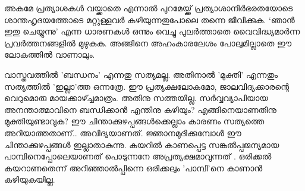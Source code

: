 അകമേ പ്രത്യാശകൾ വയ്ക്കാതെ എന്നാൽ പുറമേയ്ക്ക് പ്രത്യാശാനിര്‍ഭരതയോടെ ശാന്തഹൃദയത്തോടെ മറ്റുള്ളവർ കഴിയുന്നതുപോലെ തന്നെ ജീവിക്കുക. ‘ഞാൻ ഇതു ചെയ്യുന്നു’ എന്ന ധാരണകൾ ഒന്നും വെച്ചു പുലർത്താതെ വൈവിദ്ധ്യമാര്‍ന്ന പ്രവർത്തനങ്ങളില്‍ മുഴുകുക. അങ്ങിനെ അഹംകാരലേശം പോലുമില്ലാതെ ഈ ലോകത്തിൽ വാണാലും.

വാസ്തവത്തിൽ 'ബന്ധനം' എന്നതു സത്യമല്ല. അതിനാൽ 'മുക്തി' എന്നതും സത്യത്തില്‍ 'ഇല്ലാ'ത്ത ഒന്നത്രേ. ഈ പ്രത്യക്ഷലോകമോ, ജാലവിദ്യക്കാരന്റെ വെറുമൊരു മായക്കാഴ്ച്ചമാത്രം. അതിനു സത്തയില്ല. സർവ്വവ്യാപിയായ അനന്താത്മാവിനെ ബന്ധിക്കാൻ എന്തിനു കഴിയും? എങ്ങിനെയാണതിനു മുക്തിയുണ്ടാവുക? ഈ ചിന്താക്കുഴപ്പങ്ങൾക്കെല്ലാം കാരണം സത്യത്തെ അറിയാത്തതാണ്‌.. അവിദ്യയാണത്. ജ്ഞാനമുദിക്കുമ്പോൾ ഈ ചിന്താക്കുഴപ്പങ്ങൾ ഇല്ലാതാകുന്നു. കയറിൽ കാണപ്പെട്ട സങ്കൽപ്പജന്യമായ പാമ്പിനെപ്പോലെയാണത് പൊടുന്നനേ അപ്രത്യക്ഷമാവുന്നത് .  ഒരിക്കല്‍ കയറാണതെന്ന് അറിഞ്ഞാല്‍പ്പിന്നെ ഒരിക്കലും  'പാമ്പി'നെ കാണാന്‍ കഴിയുകയില്ല.
